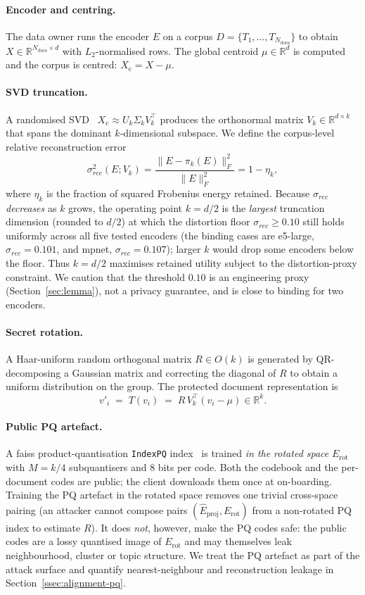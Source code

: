 \documentclass[11pt,a4paper]{article}
\begin{document}
\paragraph{Encoder and centring.} The data owner runs the encoder $E$ on a
corpus $D = \{T_1, \dots, T_{N_{\mathrm{docs}}}\}$ to obtain
$X \in \mathbb{R}^{N_{\mathrm{docs}} \times d}$ with $L_2$-normalised rows.
The global centroid $\mu \in \mathbb{R}^d$ is computed and the corpus is
centred: $X_{\mathrm{c}} = X - \mu$.

\paragraph{SVD truncation.} A randomised SVD~\cite{ref_halko,ref_eckart}
$X_{\mathrm{c}} \approx U_k \Sigma_k V_k^\top$ produces the orthonormal
matrix $V_k \in \mathbb{R}^{d \times k}$ that spans the dominant
$k$-dimensional subspace. We define the corpus-level relative
reconstruction error
\[
\sigma_{rec}^{2}(E; V_k) =
\frac{\|E - \pi_k(E)\|_F^2}{\|E\|_F^2} = 1 - \eta_k ,
\]
where $\eta_k$ is the fraction of squared Frobenius energy retained.
Because $\sigma_{rec}$ \emph{decreases} as $k$ grows, the operating point
$k = d/2$ is the \emph{largest} truncation dimension (rounded to $d/2$) at
which the distortion floor $\sigma_{rec} \geq 0.10$ still holds uniformly
across all five tested encoders (the binding cases are e5-large,
$\sigma_{rec}=0.101$, and mpnet, $\sigma_{rec}=0.107$); larger $k$ would
drop some encoders below the floor. Thus $k=d/2$ maximises retained
utility subject to the distortion-proxy constraint. We caution that the
threshold $0.10$ is an engineering proxy (Section~\ref{sec:lemma}), not a
privacy guarantee, and is close to binding for two encoders.

\paragraph{Secret rotation.} A Haar-uniform random orthogonal matrix
$R \in O(k)$ is generated by QR-decomposing a Gaussian matrix and
correcting the diagonal of $R$ to obtain a uniform distribution on the
group. The protected document representation is
\[
v'_i \;=\; T(v_i) \;=\; R\, V_k^\top (v_i - \mu) \in \mathbb{R}^k .
\]

\paragraph{Public PQ artefact.} A faiss product-quantisation
\texttt{IndexPQ} index~\cite{ref_pq} is trained
\emph{in the rotated space} $E_{\mathrm{rot}}$ with $M = k/4$ subquantisers
and $8$ bits per code. Both the codebook and the per-document codes are
public; the client downloads them once at on-boarding. Training the PQ
artefact in the rotated space removes one trivial cross-space pairing
(an attacker cannot compose pairs
$(\hat E_{\mathrm{proj}}, E_{\mathrm{rot}})$ from a non-rotated PQ index
to estimate $R$). It does \emph{not}, however, make the PQ codes safe:
the public codes are a lossy quantised image of $E_{\mathrm{rot}}$ and
may themselves leak neighbourhood, cluster or topic structure. We treat
the PQ artefact as part of the attack surface and quantify
nearest-neighbour and reconstruction leakage in
Section~\ref{ssec:alignment-pq}.
\end{document}
